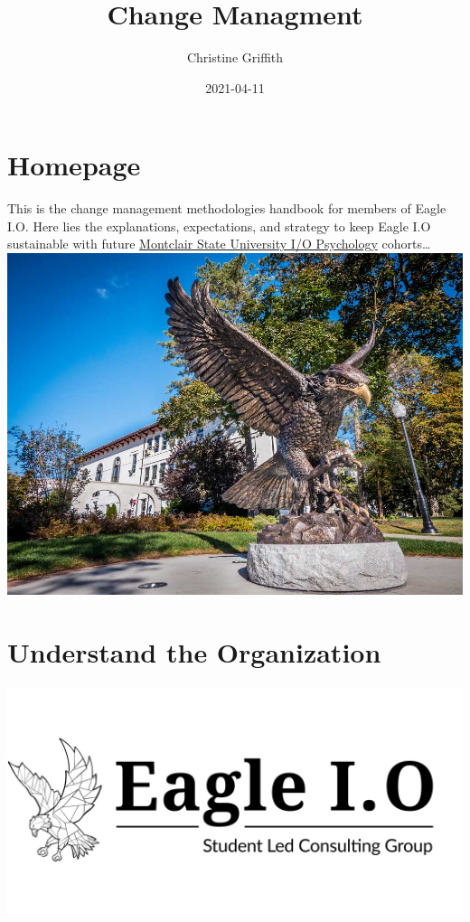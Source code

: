 \documentclass[
]{book}
\title{Change Managment}
\author{Christine Griffith}
\date{2021-04-11}
\begin{document}
\maketitle

{
\setcounter{tocdepth}{1}
\tableofcontents
}
\hypertarget{homepage}{%
\chapter*{Homepage}\label{homepage}}

This is the change management methodologies handbook for members of Eagle I.O. Here lies the explanations, expectations, and strategy to keep Eagle I.O sustainable with future \href{https://www.montclair.edu/psychology/graduate-programs/industrial-organizational-psychology/}{Montclair State University I/O Psychology} cohorts\ldots{}
\includegraphics{hawk.jpg}

\hypertarget{understand-the-organization}{%
\chapter{Understand the Organization}\label{understand-the-organization}}

\includegraphics{logo.jpg}
\end{document}
